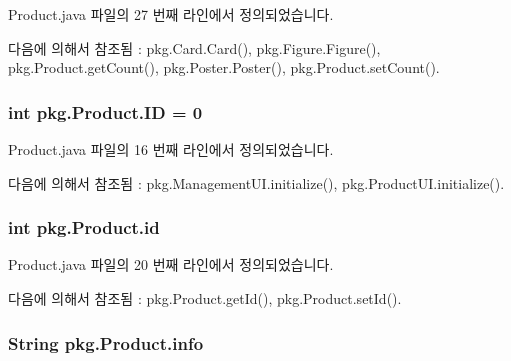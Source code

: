 Product.\+java 파일의 27 번째 라인에서 정의되었습니다.



다음에 의해서 참조됨 \+:  pkg.\+Card.\+Card(), pkg.\+Figure.\+Figure(), pkg.\+Product.\+get\+Count(), pkg.\+Poster.\+Poster(), pkg.\+Product.\+set\+Count().

\subsubsection[{\texorpdfstring{ID}{ID}}]{\setlength{\rightskip}{0pt plus 5cm}int pkg.\+Product.\+ID = 0\hspace{0.3cm}{\ttfamily [static]}}\hypertarget{classpkg_1_1_product_a228b3c9d89ad6a4f6637bf1f6f74ff64}{}\label{classpkg_1_1_product_a228b3c9d89ad6a4f6637bf1f6f74ff64}


Product.\+java 파일의 16 번째 라인에서 정의되었습니다.



다음에 의해서 참조됨 \+:  pkg.\+Management\+U\+I.\+initialize(), pkg.\+Product\+U\+I.\+initialize().

\subsubsection[{\texorpdfstring{id}{id}}]{\setlength{\rightskip}{0pt plus 5cm}int pkg.\+Product.\+id\hspace{0.3cm}{\ttfamily [protected]}}\hypertarget{classpkg_1_1_product_ac7846687b2d11faba3be1395fcbbab72}{}\label{classpkg_1_1_product_ac7846687b2d11faba3be1395fcbbab72}


Product.\+java 파일의 20 번째 라인에서 정의되었습니다.



다음에 의해서 참조됨 \+:  pkg.\+Product.\+get\+Id(), pkg.\+Product.\+set\+Id().

\subsubsection[{\texorpdfstring{info}{info}}]{\setlength{\rightskip}{0pt plus 5cm}String pkg.\+Product.\+info\hspace{0.3cm}{\ttfamily [protected]}}\hypertarget{classpkg_1_1_product_ade3d909a0e7d15ec98c2f27eecd637cd}{}\label{classpkg_1_1_product_ade3d909a0e7d15ec98c2f27eecd637cd}



